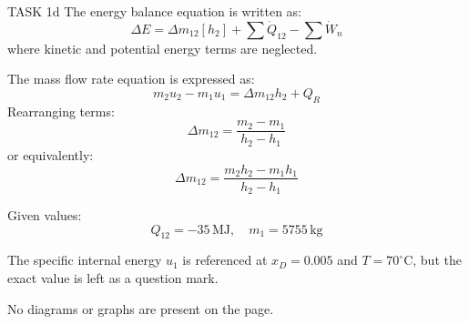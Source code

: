 TASK 1d  
The energy balance equation is written as:  
\[
\Delta E = \Delta m_{12} \left[ h_2 \right] + \sum \dot{Q}_{12} - \sum \dot{W}_n
\]  
where kinetic and potential energy terms are neglected.  

The mass flow rate equation is expressed as:  
\[
m_2 u_2 - m_1 u_1 = \Delta m_{12} h_2 + Q_{R}
\]  
Rearranging terms:  
\[
\Delta m_{12} = \frac{m_2 - m_1}{h_2 - h_1}
\]  
or equivalently:  
\[
\Delta m_{12} = \frac{m_2 h_2 - m_1 h_1}{h_2 - h_1}
\]  

Given values:  
\[
Q_{12} = -35 \, \text{MJ}, \quad m_1 = 5755 \, \text{kg}
\]  

The specific internal energy \( u_1 \) is referenced at \( x_D = 0.005 \) and \( T = 70^\circ\text{C} \), but the exact value is left as a question mark.  

No diagrams or graphs are present on the page.